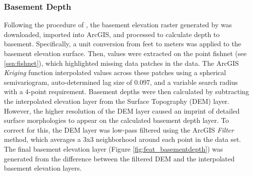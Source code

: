 \subsubsection{Basement Depth}

Following the procedure of \citet{pepin_new_2018}, the basement elevation raster generated by \citet{bielicki_hydrogeolgic_2015} was downloaded, imported into ArcGIS, and processed to calculate depth to basement. Specifically, a unit conversion from feet to meters was applied to the basement elevation surface. Then, values were extracted on the point fishnet (see \ref{ssn:fishnet}), which highlighted missing data patches in the data. The ArcGIS \textit{Kriging} function interpolated values across these patches using a spherical semivariogram, auto-determined lag size of 0.097, and a variable search radius with a 4-point requirement. Basement depths were then calculated by subtracting the interpolated elevation layer from the Surface Topography (DEM) layer. However, the higher resolution of the DEM layer caused an imprint of detailed surface morphologies to appear on the calculated basement depth layer. To correct for this, the DEM layer was low-pass filtered using the ArcGIS \textit{Filter} method, which averages a 3x3 neighborhood around each point in the data set. The final basement elevation layer (Figure \ref{fig:feat_basementdepth}) was generated from the difference between the filtered DEM and the interpolated basement elevation layers.

